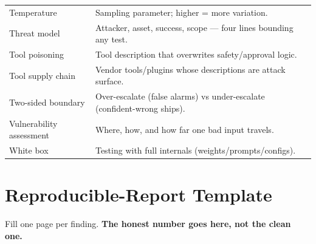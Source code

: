 \begin{center}
\begin{tabularx}{\linewidth}{lX}
Temperature & Sampling parameter; higher = more variation. \\
Threat model & Attacker, asset, success, scope — four lines bounding any test. \\
Tool poisoning & Tool description that overwrites safety/approval logic. \\
Tool supply chain & Vendor tools/plugins whose descriptions are attack surface. \\
Two-sided boundary & Over-escalate (false alarms) vs under-escalate (confident-wrong ships). \\
Vulnerability assessment & Where, how, and how far one bad input travels. \\
White box & Testing with full internals (weights/prompts/configs). \\
\bottomrule
\end{tabularx}
\end{center}

\newpage
\chapter*{Reproducible-Report Template}

\noindent Fill one page per finding. \textbf{The honest number goes here, not the clean one.}

